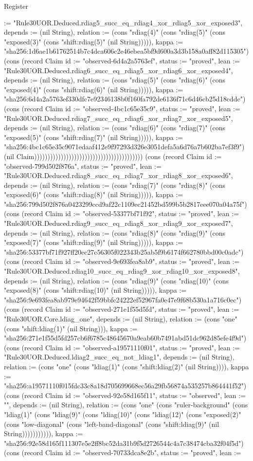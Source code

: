\begin{lexlean}{Register}
\begin{semanticmodule}
{:= "Rule30UOR.Deduced.rdiag5_succ_eq_rdiag4_xor_rdiag5_xor_exposed3", depends := (nil String), relation := (cons "rdiag(4)" (cons "rdiag(5)" (cons "exposed(3)" (cons "shift:rdiag(5)" (nil String))))), kappa := "sha256:1d6ae1b61762514b7c4dca606c2e46ebea5bf9d600a3d3b158a0aff82d115305"}) (cons (record Claim {id := "observed-6d4a2a5763ef", status := "proved", lean := "Rule30UOR.Deduced.rdiag6_succ_eq_rdiag5_xor_rdiag6_xor_exposed4", depends := (nil String), relation := (cons "rdiag(5)" (cons "rdiag(6)" (cons "exposed(4)" (cons "shift:rdiag(6)" (nil String))))), kappa := "sha256:6d4a2a5763ef330dfc7e92346138b0f160fa792de6136f71c6d46cb25d18cddc"}) (cons (record Claim {id := "observed-4bc1c65e35c9", status := "proved", lean := "Rule30UOR.Deduced.rdiag7_succ_eq_rdiag6_xor_rdiag7_xor_exposed5", depends := (nil String), relation := (cons "rdiag(6)" (cons "rdiag(7)" (cons "exposed(5)" (cons "shift:rdiag(7)" (nil String))))), kappa := "sha256:4bc1c65e35c9071edaaf412e9f97293d326e3051defa5a6d76a7b602ba7ef3f9"}) (nil Claim))))))))))))))))))))))))))))))))))))))))) (cons (record Claim {id := "observed-799d502f876a", status := "proved", lean := "Rule30UOR.Deduced.rdiag8_succ_eq_rdiag7_xor_rdiag8_xor_exposed6", depends := (nil String), relation := (cons "rdiag(7)" (cons "rdiag(8)" (cons "exposed(6)" (cons "shift:rdiag(8)" (nil String))))), kappa := "sha256:799d502f876a0423299ccd9af22c1109ec21452bd599b5b2817eee070a04a75f"}) (cons (record Claim {id := "observed-53377bf71f92", status := "proved", lean := "Rule30UOR.Deduced.rdiag9_succ_eq_rdiag8_xor_rdiag9_xor_exposed7", depends := (nil String), relation := (cons "rdiag(8)" (cons "rdiag(9)" (cons "exposed(7)" (cons "shift:rdiag(9)" (nil String))))), kappa := "sha256:53377bf71f927ff20ec27c56305f022343b25ab5f9b6174f662780bbd00c0adc"}) (cons (record Claim {id := "observed-9e693fea8ab9", status := "proved", lean := "Rule30UOR.Deduced.rdiag10_succ_eq_rdiag9_xor_rdiag10_xor_exposed8", depends := (nil String), relation := (cons "rdiag(9)" (cons "rdiag(10)" (cons "exposed(8)" (cons "shift:rdiag(10)" (nil String))))), kappa := "sha256:9e693fea8ab979e94642f59bbfc24222ef52967fa0e47e9f68b530a1a716c0ec"}) (cons (record Claim {id := "observed-271e1f55d5fd", status := "proved", lean := "Rule30UOR.Core.ldiag_one", depends := (nil String), relation := (cons "one" (cons "shift:ldiag(1)" (nil String))), kappa := "sha256:271e1f55d5fd257cb6f6785c48645670a9eab60b7491abd51dc962d85efe4f9d"}) (cons (record Claim {id := "observed-a19571110f01", status := "proved", lean := "Rule30UOR.Deduced.ldiag2_succ_eq_not_ldiag1", depends := (nil String), relation := (cons "one" (cons "ldiag(1)" (cons "shift:ldiag(2)" (nil String)))), kappa := "sha256:a19571110f015fdc33c8a18d705699668ec56a29fb56874a535257b864441f52"}) (cons (record Claim {id := "observed-92e58d165f11", status := "observed", lean := "", depends := (nil String), relation := (cons "one" (cons "ruler-background" (cons "ldiag(1)" (cons "ldiag(9)" (cons "ldiag(10)" (cons "ldiag(12)" (cons "exposed(2)" (cons "low-diagonal" (cons "left-band-diagonal" (cons "shift:ldiag(9)" (nil String))))))))))), kappa := "sha256:92e58d165f111307e5e2ff8bc52da31b9f5d2726544c4a7c38474cba32f04f5d"}) (cons (record Claim {id := "observed-70733dca8e2b", status := "proved", lean := }
\end{semanticmodule}
\end{lexlean}
